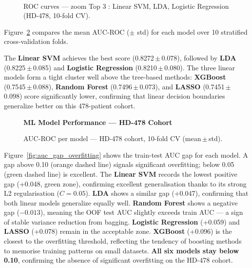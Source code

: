 \documentclass[12pt,a4paper,twoside]{report}
\begin{document}
\begin{figure}[htbp]
\centering
{}\\[4pt]
\caption{ROC curves --- zoom Top 3 : Linear SVM, LDA, Logistic Regression (HD-478, 10-fold CV).}
\label{fig:roc_curves_zoom}
\end{figure}

\FloatBarrier
Figure~\ref{fig:auc_gap} compares the mean AUC-ROC ($\pm$ std) for each model over 10 stratified cross-validation folds.

The \textbf{Linear SVM} achieves the best score (0.8272\,$\pm$\,0.078), followed by \textbf{LDA} (0.8225\,$\pm$\,0.085) and \textbf{Logistic Regression} (0.8210\,$\pm$\,0.080). The three linear models form a tight cluster well above the tree-based methods: \textbf{XGBoost} (0.7545\,$\pm$\,0.088), \textbf{Random Forest} (0.7496\,$\pm$\,0.073), and \textbf{LASSO} (0.7451\,$\pm$\,0.098) score significantly lower, confirming that linear decision boundaries generalize better on this 478-patient cohort.

\begin{figure}[htbp]
\centering
{\small\bfseries ML Model Performance --- HD-478 Cohort}\\[4pt]
\caption{AUC-ROC per model --- HD-478 cohort, 10-fold CV (mean\,$\pm$\,std).}
\label{fig:auc_gap}
\end{figure}

\FloatBarrier
Figure~\ref{fig:auc_gap_overfitting} shows the train-test AUC gap for each model. A gap above 0.10 (orange dashed line) signals significant overfitting; below 0.05 (green dashed line) is excellent. The \textbf{Linear SVM} records the lowest positive gap (+0.048, green zone), confirming excellent generalisation thanks to its strong L2 regularisation ($C=0.05$). \textbf{LDA} shows a similar gap (+0.047), confirming that both linear models generalize equally well. \textbf{Random Forest} shows a negative gap ($-0.013$), meaning the OOF test AUC slightly exceeds train AUC --- a sign of stable variance reduction from bagging. \textbf{Logistic Regression} (+0.059) and \textbf{LASSO} (+0.078) remain in the acceptable zone. \textbf{XGBoost} (+0.096) is the closest to the overfitting threshold, reflecting the tendency of boosting methods to memorise training patterns on small datasets. \textbf{All six models stay below 0.10}, confirming the absence of significant overfitting on the HD-478 cohort.
\end{document}
